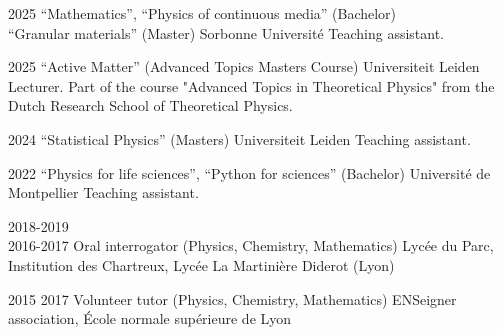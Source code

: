 \documentclass[a4paper]{cvtemplate_en} %
\begin{document}
\begin{cvbody}

\cvitem
    {2025}
    {}
    {``Mathematics'', ``Physics of continuous media'' (Bachelor)\\ ``Granular materials'' (Master)}
    {Sorbonne Universit\'e }
    {}{}{}
    {}
    {Teaching assistant.\vspace{5pt}}

\cvitem
	{2025}
	{}
	{``Active Matter'' (Advanced Topics Masters Course)}
	{Universiteit Leiden }
	{}{}{}
	{}
	{Lecturer. Part of the course "Advanced Topics in Theoretical Physics" from the Dutch Research School of Theoretical Physics.\vspace{5pt}}

\cvitem
	{2024}
	{}
	{``Statistical Physics'' (Masters)}
	{Universiteit Leiden }
	{}{}{}
	{}
	{Teaching assistant.\vspace{5pt}}

\cvitem
	{2022}
	{}
	{``Physics for life sciences'', ``Python for sciences'' (Bachelor)}
	{Université de Montpellier }
	{}{}{}
    {}
	{Teaching assistant.\vspace{5pt}}

\cvitem
	{2018-2019\\ \mbox{}\hfill 2016-2017}
	{}
	{Oral interrogator (Physics, Chemistry, Mathematics)}
	{Lyc\'ee du Parc, Institution des Chartreux, Lyc\'ee La Martinière Diderot (Lyon) }
	{}{}{}
	{}
	{\vspace{5pt}
	}


\cvitem
	{2015}
	{2017}
	{Volunteer tutor (Physics, Chemistry, Mathematics)}
	{ENSeigner association, \'Ecole normale sup\'erieure de Lyon }
	{}{}{}
	{}
	{\vspace{5pt}
	}

\end{cvbody}
\end{document}
